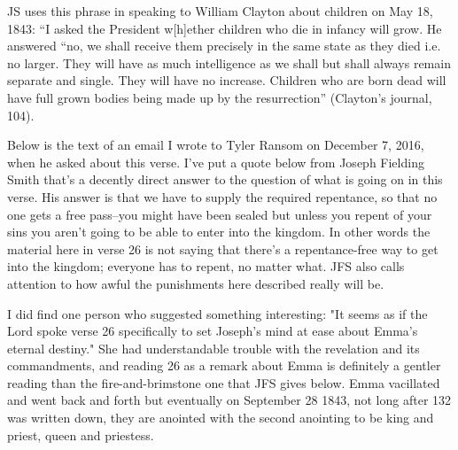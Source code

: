 		\begin{compactdesc}
		
		\item[17$\vert$] %
		\begin{compactdesc}
		\item[separately and singly] JS uses this phrase in speaking to William Clayton about children on May 18, 1843: ``I asked the President w[h]ether children who die in infancy will grow. He answered ``no, we shall receive them precisely in the same state as they died i.e. no larger. They will have as much intelligence as we shall but shall always remain separate and single. They will have no increase. Children who are born dead will have full grown bodies being made up by the resurrection'' (Clayton's journal, 104).
		\end{compactdesc}
		
		\item[26$\vert$] %
		\begin{compactdesc}
		\item[a free pass for sin?] Below is the text of an email I wrote to Tyler Ransom on December 7, 2016, when he asked about this verse.
					I've put a quote below from Joseph Fielding Smith that's a decently direct answer to the question of what is going on in this verse. His answer is that we have to supply the required repentance, so that no one gets a free pass--you might have been sealed but unless you repent of your sins you aren't going to be able to enter into the kingdom. In other words the material here in verse 26 is not saying that there's a repentance-free way to get into the kingdom; everyone has to repent, no matter what. JFS also calls attention to how awful the punishments here described really will be.

					I did find one person who suggested something interesting: "It seems as if the Lord spoke verse 26 specifically to set Joseph's mind at ease about Emma's eternal destiny." She had understandable trouble with the revelation and its commandments, and reading 26 as a remark about Emma is definitely a gentler reading than the fire-and-brimstone one that JFS gives below. Emma vacillated and went back and forth but eventually on September 28 1843, not long after 132 was written down, they are anointed with the second anointing to be king and priest, queen and priestess. 


\end{compactdesc}
\end{compactdesc}
